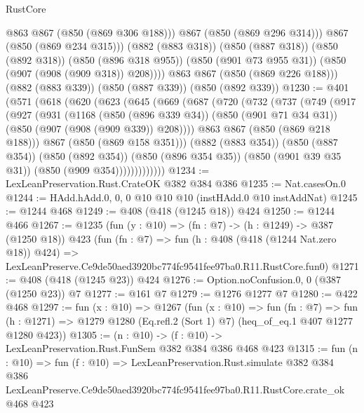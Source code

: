 \begin{lexlean}{RustCore}
\begin{coremodule}
                @863
                @867
                (@850 (@869 @306 @188)))
              @867
              (@850 (@869 @296 @314)))
            @867
            (@850 (@869 @234 @315)))
          (@882 (@883 @318))
          (@850 (@887 @318))
          (@850 (@892 @318))
          (@850 (@896 @318 @955))
          (@850 (@901 @73 @955 @31))
          (@850 (@907 (@908 (@909 @318)) @208))))
      @863
      @867
      (@850 (@869 @226 @188)))
    (@882 (@883 @339))
    (@850 (@887 @339))
    (@850 (@892 @339))
@1230 := @401
    (@571
      (@618
        (@620
          (@623
            (@645
              (@669
                (@687
                  (@720
                    (@732
                      (@737
                        (@749
                          (@917
                            (@927
                              (@931
                                (@1168
                                  (@850 (@896 @339 @34))
                                  (@850 (@901 @71 @34 @31))
                                  (@850 (@907 (@908 (@909 @339)) @208))))
                              @863
                              @867
                              (@850 (@869 @218 @188)))
                            @867
                            (@850 (@869 @158 @351)))
                          (@882 (@883 @354))
                          (@850 (@887 @354))
                          (@850 (@892 @354))
                          (@850 (@896 @354 @35))
                          (@850 (@901 @39 @35 @31))
                          (@850 (@909 @354)))))))))))))
@1234 := LexLeanPreservation.Rust.CrateOK @382 @384 @386
@1235 := Nat.casesOn.{0}
@1244 := HAdd.hAdd.{0, 0, 0} @10 @10 @10 (instHAdd.{0} @10 instAddNat)
@1245 := @1244 @468
@1249 := @408 (@418 (@1245 @18)) @424
@1250 := @1244 @466
@1267 := @1235
    (fun (y : @10) => (fn : @7) -> (h : @1249) -> @387 (@1250 @18))
    @423
    (fun (fn : @7) =>
    fun (h : @408 (@418 (@1244 Nat.zero @18)) @424) =>
    LexLeanPreserve.Ce9de50aed3920bc774fc9541fee97ba0.R11.RustCore.fun0)
@1271 := @408 (@418 (@1245 @23)) @424
@1276 := Option.noConfusion.{0, 0} (@387 (@1250 @23)) @7
@1277 := @161 @7
@1279 := @1276 @1277 @7
@1280 := @422 @468
@1297 := fun (x : @10) =>
  @1267
    (fun (x : @10) =>
    fun (fn : @7) =>
    fun (h : @1271) => @1279 @1280 (Eq.refl.{2} (Sort 1) @7) (heq_of_eq.{1} @407 @1277 @1280 @423))
@1305 := (n : @10) -> (f : @10) -> LexLeanPreservation.Rust.FunSem @382 @384 @386 @468 @423
@1315 := fun (n : @10) =>
  fun (f : @10) =>
  LexLeanPreservation.Rust.simulate
    @382
    @384
    @386
    LexLeanPreserve.Ce9de50aed3920bc774fc9541fee97ba0.R11.RustCore.crate_ok
    @468
    @423
\end{coremodule}
\end{lexlean}
